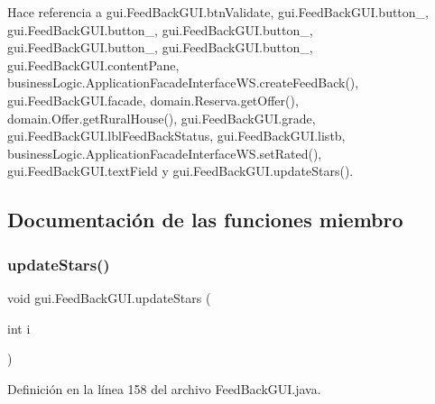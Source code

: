 Hace referencia a gui.\+Feed\+Back\+G\+U\+I.\+btn\+Validate, gui.\+Feed\+Back\+G\+U\+I.\+button\+\_, gui.\+Feed\+Back\+G\+U\+I.\+button\+\_, gui.\+Feed\+Back\+G\+U\+I.\+button\+\_, gui.\+Feed\+Back\+G\+U\+I.\+button\+\_, gui.\+Feed\+Back\+G\+U\+I.\+button\+\_, gui.\+Feed\+Back\+G\+U\+I.\+content\+Pane, business\+Logic.\+Application\+Facade\+Interface\+W\+S.\+create\+Feed\+Back(), gui.\+Feed\+Back\+G\+U\+I.\+facade, domain.\+Reserva.\+get\+Offer(), domain.\+Offer.\+get\+Rural\+House(), gui.\+Feed\+Back\+G\+U\+I.\+grade, gui.\+Feed\+Back\+G\+U\+I.\+lbl\+Feed\+Back\+Status, gui.\+Feed\+Back\+G\+U\+I.\+listb, business\+Logic.\+Application\+Facade\+Interface\+W\+S.\+set\+Rated(), gui.\+Feed\+Back\+G\+U\+I.\+text\+Field y gui.\+Feed\+Back\+G\+U\+I.\+update\+Stars().



\subsection{Documentación de las funciones miembro}
\mbox{\label{classgui_1_1_feed_back_g_u_i_a70a8204a531b922364fdef575045e505}} 
\subsubsection{\texorpdfstring{updateStars()}{updateStars()}}
{\footnotesize\ttfamily void gui.\+Feed\+Back\+G\+U\+I.\+update\+Stars (\begin{DoxyParamCaption}\item[{int}]{i }\end{DoxyParamCaption})}



Definición en la línea 158 del archivo Feed\+Back\+G\+U\+I.\+java.


